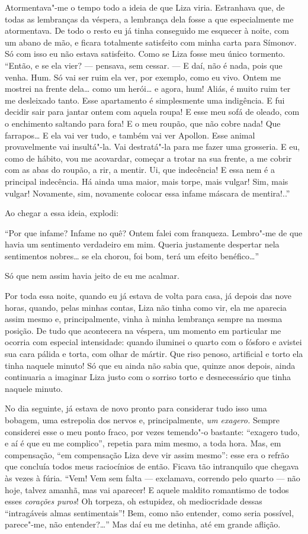 Atormentava"-me o tempo todo a ideia de que Liza viria. Estranhava que,
de todas as lembranças da véspera, a lembrança dela fosse a que
especialmente me atormentava. De todo o resto eu já tinha conseguido me
esquecer à noite, com um abano de mão, e ficara totalmente satisfeito
com minha carta para Símonov. Só com isso eu não estava satisfeito. Como
se Liza fosse meu único tormento. ``Então, e se ela vier? --- pensava, sem
cessar. --- E daí, não é nada, pois que venha. Hum. Só vai ser ruim ela
ver, por exemplo, como eu vivo. Ontem me mostrei na frente dela\ldots{} como
um herói\ldots{} e agora, hum! Aliás, é muito ruim ter me desleixado tanto.
Esse apartamento é simplesmente uma indigência. E fui decidir sair para
jantar ontem com aquela roupa! E esse meu sofá de oleado, com o
enchimento saltando para fora! E o meu roupão, que não cobre nada! Que
farrapos\ldots{} E ela vai ver tudo, e também vai ver Apollon. Esse animal
provavelmente vai insultá"-la. Vai destratá"-la para me fazer uma
grosseria. E eu, como de hábito, vou me acovardar, começar a trotar na
sua frente, a me cobrir com as abas do roupão, a rir, a mentir. Ui, que
indecência! E essa nem é a principal indecência. Há ainda uma maior,
mais torpe, mais vulgar! Sim, mais vulgar! Novamente, sim, novamente
colocar essa infame máscara de mentira!..''

Ao chegar a essa ideia, explodi:

``Por que infame? Infame no quê? Ontem falei com franqueza. Lembro"-me de
que havia um sentimento verdadeiro em mim. Queria justamente despertar
nela sentimentos nobres\ldots{} se ela chorou, foi bom, terá um efeito
benéfico\ldots{}''

Só que nem assim havia jeito de eu me acalmar.

Por toda essa noite, quando eu já estava de volta para casa, já depois
das nove horas, quando, pelas minhas contas, Liza não tinha como vir,
ela me aparecia assim mesmo e, principalmente, vinha à minha lembrança
sempre na mesma posição. De tudo que acontecera na véspera, um momento
em particular me ocorria com especial intensidade: quando iluminei o
quarto com o fósforo e avistei sua cara pálida e torta, com olhar de
mártir. Que riso penoso, artificial e torto ela tinha naquele minuto! Só
que eu ainda não sabia que, quinze anos depois, ainda continuaria a
imaginar Liza justo com o sorriso torto e desnecessário que tinha
naquele minuto.

No dia seguinte, já estava de novo pronto para considerar tudo isso uma
bobagem, uma estrepolia dos nervos e, principalmente, \emph{um exagero.}
Sempre considerei esse o meu ponto fraco, por vezes temendo"-o bastante:
``exagero tudo, e aí é que eu me complico'', repetia para mim mesmo, a
toda hora. Mas, em compensação, ``em compensação Liza deve vir assim
mesmo'': esse era o refrão que concluía todos meus raciocínios de então.
Ficava tão intranquilo que chegava às vezes à fúria. ``Vem! Vem sem
falta --- exclamava, correndo pelo quarto --- não hoje, talvez amanhã, mas
vai aparecer! E aquele maldito romantismo de todos esses \emph{corações
puros}! Oh torpeza, oh estupidez, oh mediocridade dessas ``intragáveis
almas sentimentais''! Bem, como não entender, como seria possível,
parece"-me, não entender?\ldots{}'' Mas daí eu me detinha, até em grande
aflição.

